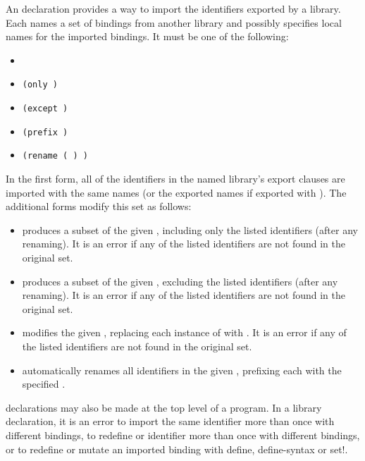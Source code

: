 An  declaration provides a way to import the identifiers
exported by a library.  Each  names a set of bindings
from another library and possibly specifies local names for the
imported bindings. It must be one of the following:

\begin{itemize}
\item {\tt{}}
\item {\tt(only   \dotsfoo)}
\item {\tt(except   \dotsfoo)}
\item {\tt(prefix  )}
\item {\tt(rename  ( ) \dotsfoo)}
\end{itemize}

In the first form, all of the identifiers in the named library's export
clauses are imported with the same names (or the exported names if
exported with ).  The additional 
forms modify this set as follows:

\begin{itemize}

\item {} produces a subset of the given
  , including only the listed identifiers (after any
  renaming).  It is an error if any of the listed identifiers are
  not found in the original set.

\item {} produces a subset of the given
  , excluding the listed identifiers (after any
  renaming). It is an error if any of the listed identifiers are not
  found in the original set.

\item {} modifies the given ,
  replacing each instance of  with
  . It is an error if any of the listed
  identifiers are not found in the original set.

\item {} automatically renames all identifiers in
  the given , prefixing each with the specified
  .

\end{itemize}

 declarations may also be made at the top level of a
program.  In a library declaration, it is an error to import the same
identifier more than once with different bindings, to redefine or
identifier more than once with different bindings, or to redefine or
mutate an imported binding with {\cf define}, {\cf define-syntax}
or {\cf set!}.


